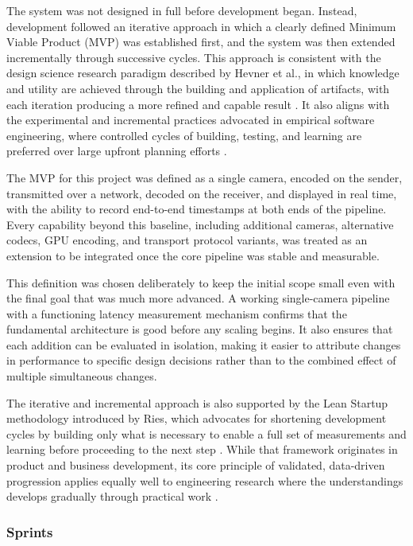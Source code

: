 The system was not designed in full before development began. Instead, development followed an iterative approach in which a clearly defined Minimum Viable Product (MVP) was established first, and the system was then extended incrementally through successive cycles. This approach is consistent with the design science research paradigm described by Hevner et al., in which knowledge and utility are achieved through the building and application of artifacts, with each iteration producing a more refined and capable result \cite{hevner2004}. It also aligns with the experimental and incremental practices advocated in empirical software engineering, where controlled cycles of building, testing, and learning are preferred over large upfront planning efforts \cite{wohlin2012}.

The MVP for this project was defined as a single camera, encoded on the sender, transmitted over a network, decoded on the receiver, and displayed in real time, with the ability to record end-to-end timestamps at both ends of the pipeline. Every capability beyond this baseline, including additional cameras, alternative codecs, GPU encoding, and transport protocol variants, was treated as an extension to be integrated once the core pipeline was stable and measurable.

This definition was chosen deliberately to keep the initial scope small even with the final goal that was much more advanced. A working single-camera pipeline with a functioning latency measurement mechanism confirms that the fundamental architecture is good before any scaling begins. It also ensures that each addition can be evaluated in isolation, making it easier to attribute changes in performance to specific design decisions rather than to the combined effect of multiple simultaneous changes.

The iterative and incremental approach is also supported by the Lean Startup methodology introduced by Ries, which advocates for shortening development cycles by building only what is necessary to enable a full set of measurements and learning before proceeding to the next step \cite{ries2011}. While that framework originates in product and business development, its core principle of validated, data-driven progression applies equally well to engineering research where the understandings develops gradually through practical work \cite{saunders2019}.

\subsubsection{Sprints}

